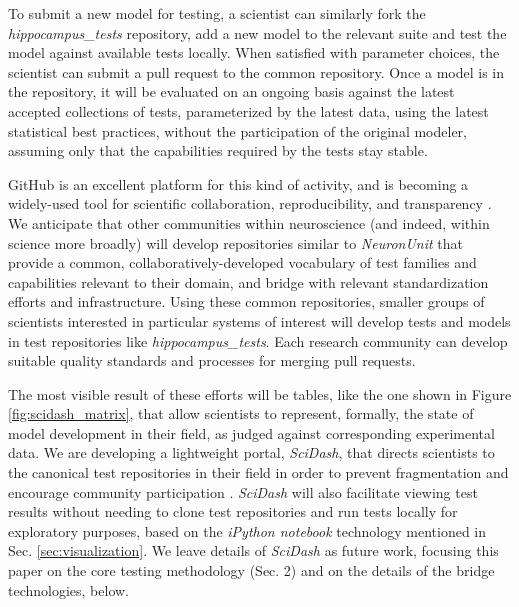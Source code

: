 \documentclass{frontiersSCNS}
\begin{document}
To submit a new model for testing, a scientist can similarly fork the \textit{hippocampus\_tests} repository, add a new model to the relevant suite and test the model against available tests locally. 
When satisfied with parameter choices, the scientist can submit a pull request to the common repository. 
Once a model is in the repository, it will be evaluated on an ongoing basis against the latest accepted collections of tests, parameterized by the latest data, using the latest statistical best practices, without the participation of the original modeler, assuming only that the capabilities required by the tests stay stable.  

GitHub is an excellent platform for this kind of activity, and is becoming a widely-used tool for scientific collaboration, reproducibility, and transparency \citep{ram_git_2013}.  
We anticipate that other communities within neuroscience (and indeed, within science more broadly) will develop repositories similar to \textit{NeuronUnit} that provide a common, collaboratively-developed vocabulary of test families and capabilities relevant to their domain, and bridge with relevant standardization efforts and infrastructure. 
Using these common repositories, smaller groups of scientists interested in particular systems of interest will develop tests and models in test repositories like \textit{hippocampus\_tests}. 
Each research community can develop suitable quality standards and processes for merging pull requests. 

The most visible result of these efforts will be tables, like the one shown in Figure \ref{fig:scidash_matrix}, that allow scientists to represent, formally, the state of model development in their field, as judged against corresponding experimental data. 
We are developing a lightweight portal, \textit{SciDash}, that directs scientists to the canonical test repositories in their field in order to prevent fragmentation and encourage community participation \citep{omar_sciunit_2013}. 
\textit{SciDash} will also facilitate viewing test results without needing to clone test repositories and run tests locally for exploratory purposes, based on the \textit{iPython notebook} technology mentioned in Sec. \ref{sec:visualization}. 
We leave details of \textit{SciDash} as future work, focusing this paper on the core testing methodology (Sec. 2) and on the details of the bridge technologies, below.
\end{document}
